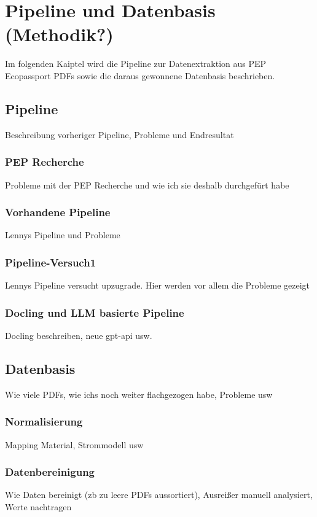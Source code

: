 \chapter{Pipeline und Datenbasis (Methodik?)}
Im folgenden Kaiptel wird die Pipeline zur Datenextraktion aus PEP Ecopassport PDFs sowie die daraus gewonnene Datenbasis beschrieben.
 
\section{Pipeline}

Beschreibung vorheriger Pipeline, Probleme und Endresultat

\subsection{PEP Recherche}
Probleme mit der PEP Recherche und wie ich sie deshalb durchgefürt habe

\subsection{Vorhandene Pipeline}
Lennys Pipeline und Probleme

\subsection{Pipeline-Versuch1}
Lennys Pipeline versucht upzugrade. Hier werden vor allem die Probleme gezeigt

\subsection{Docling und LLM basierte Pipeline}
Docling beschreiben, neue gpt-api usw.


\section{Datenbasis}
Wie viele PDFs, wie ichs noch weiter flachgezogen habe, Probleme usw

\subsection{Normalisierung}
Mapping Material, Strommodell usw

\subsection{Datenbereinigung} 
Wie Daten bereinigt (zb zu leere PDFs aussortiert), Ausreißer manuell analysiert, Werte nachtragen
